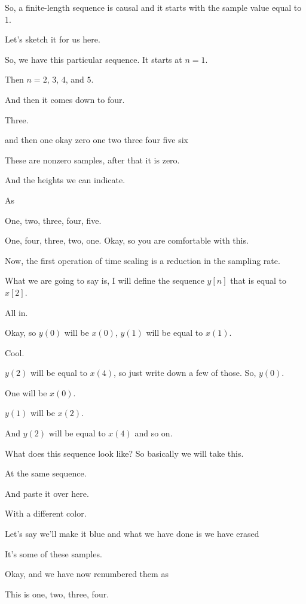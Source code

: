 \documentclass[11pt,a4paper]{article}
\begin{document}
So, a finite-length sequence is causal and it starts with the sample value equal to 1.

Let's sketch it for us here.

So, we have this particular sequence. It starts at $n = 1$.

Then $n = 2$, $3$, $4$, and $5$.

And then it comes down to four.

Three.

and then one okay zero one two three four five six

These are nonzero samples, after that it is zero.

And the heights we can indicate.

As

One, two, three, four, five.

One, four, three, two, one. Okay, so you are comfortable with this.

Now, the first operation of time scaling is a reduction in the sampling rate.

What we are going to say is, I will define the sequence $y[n]$ that is equal to $x[2]$.

All in.

Okay, so $y(0)$ will be $x(0)$, $y(1)$ will be equal to $x(1)$.

Cool.

$y(2)$ will be equal to $x(4)$, so just write down a few of those. So, $y(0)$.

One will be $x(0)$.

$y(1)$ will be $x(2)$.

And $y(2)$ will be equal to $x(4)$ and so on.

What does this sequence look like? So basically we will take this.

At the same sequence.

And paste it over here.

With a different color.

Let's say we'll make it blue and what we have done is we have erased

It's some of these samples.

Okay, and we have now renumbered them as

This is one, two, three, four.
\end{document}
